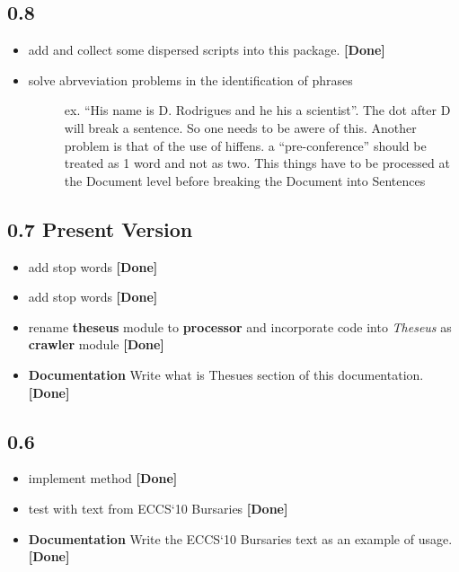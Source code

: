 \documentclass[letterpaper,10pt,english]{sphinxmanual}
\begin{document}
\subsection{0.8}
\label{TODO:id1}\begin{itemize}
\item {} 
add  and collect some dispersed scripts into this package. \textbf{{[}Done{]}}

\item {} \begin{description}
\item[{solve abrveviation problems in the identification of phrases}] \leavevmode
ex. ``His name is D. Rodrigues and he his a scientist''. The dot after D will break a sentence.
So one needs to be awere of this.
Another problem is that of the use of hiffens. a ``pre-conference'' should be treated as 1 word and not as two.
This things have to be processed at the Document level before breaking the Document into Sentences

\end{description}

\end{itemize}


\subsection{0.7 \textbf{Present Version}}
\label{TODO:present-version}\begin{itemize}
\item {} 
add  stop words \textbf{{[}Done{]}}

\item {} 
add  stop words \textbf{{[}Done{]}}

\item {} 
rename \textbf{theseus} module to \textbf{processor} and incorporate  code into \emph{Theseus} as \textbf{crawler} module \textbf{{[}Done{]}}

\item {} 
\textbf{Documentation} Write what is Thesues section of this documentation. \textbf{{[}Done{]}}

\end{itemize}


\subsection{0.6}
\label{TODO:id2}\begin{itemize}
\item {} 
implement  method \textbf{{[}Done{]}}

\item {} 
test  with text from ECCS`10 Bursaries \textbf{{[}Done{]}}

\item {} 
\textbf{Documentation} Write the ECCS`10 Bursaries text as an example of usage. \textbf{{[}Done{]}}

\end{itemize}
\end{document}
